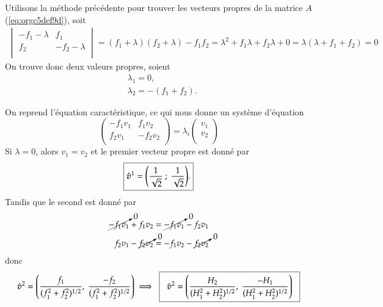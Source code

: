 \documentclass[10pt]{article}
\numberwithin{equation}{section}
\newcommand{\vv}{\vb*{v}}
\begin{document}
Utilisons la méthode précédente pour trouver les vecteurs propres de la matrice \(A\) (\ref{eq:orgc5def9d}), soit
\begin{align}
   \begin{vmatrix}
     -f_1 - \lambda & f_1 \\
     f_2 & -f_2 - \lambda \\
   \end{vmatrix} = (f_1+\lambda)(f_2+\lambda) - f_1 f_2 = \lambda^2 + f_1 \lambda + f_2 \lambda + 0 =\boxed{ \lambda(\lambda + f_1 + f_2) = 0 }
\end{align}
On trouve donc deux valeurs propres, soient
\begin{subequations}
\begin{align}
   & \lambda_1 = 0, \\
   & \lambda_2 = - (f_1+f_2).
\end{align}
\end{subequations}

On reprend l'équation caractéristique, ce qui nous donne un système d'équation
\begin{equation}
   \begin{pmatrix}
     - f_1 v_1 & f_1 v_2 \\
     f_2 v_1 & -f_2 v_2 \\
   \end{pmatrix} = \lambda_i
   \begin{pmatrix}
     v_1\\
     v_2\\
   \end{pmatrix}
\end{equation}
Si \(\lambda = 0\), alors \(v_1 = v_2\) et le premier vecteur propre est donné par
\begin{equation}
   \boxed{\hat{\vv}^1 = \qty( \frac{1}{\sqrt{2}}\ ;\ \frac{1}{\sqrt{2}}).}
\end{equation}
Tandis que le second est donné par
\begin{align}
   \cancelto{0}{-f_1 v_1} + f_1 v_2 & = \cancelto{0}{-f_1 v_1} - f_2 v_1 \\
   f_2 v_1 - \cancelto{0}{f_2 v_2} & = -f_1 v_2 - \cancelto{0}{f_2 v_2} \\
\end{align}
donc
\begin{equation}
   \hat{\vv}^2 = \qty( \frac{f_1}{(f_1^2+f_2^2)^{1/2}},\ \frac{-f_2}{(f_1^2+f_2^2)^{1/2}})\ \Longrightarrow \hspace{0.2cm}\boxed{\hspace{0.2cm}\hat{\vv}^2=\qty( \frac{H_2}{(H_1^2+H_2^2)^{1/2}},\ \frac{-H_1}{(H_1^2+H_2^2)^{1/2}})\hspace{0.2cm}}
\end{equation}
\end{document}
